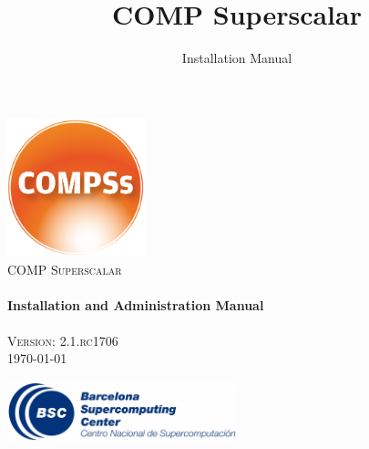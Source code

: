 \documentclass[a4paper,12pt]{article}
\title{COMP Superscalar}
\author{Installation Manual}
\def \compssversion {2.1.rc1706}
\begin{document}
  \hypersetup{pageanchor=false}
  \begin{titlepage} 
    \begin{center} 
      \includegraphics[width=0.3\textwidth]{./Figures/Logos/degradado-naranja-compss.jpg}~\\[1cm] 
      \textsc{\LARGE COMP Superscalar}\\[1.5cm] 
      
      \HRule \\[0.4cm] 
      { \huge \bfseries Installation and Administration Manual \\[0.4cm] }
      \HRule \\[1.5cm] 

      { \large \textsc{Version: \compssversion}} \\[0.3cm]
      { \large \today } 
      
      \vfill 
      \includegraphics[width=0.5\textwidth]{./Figures/bsc_280.jpg}~\\[1cm]
    \end{center} 
  \end{titlepage}
  \hypersetup{pageanchor=true}
  
\end{document}
